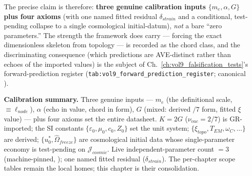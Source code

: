 \noindent The precise claim is therefore: \textbf{three genuine calibration inputs $\{m_e, \alpha, G\}$ plus four axioms} (with one named fitted residual $\delta_{strain}$ and a conditional, test-pending collapse to a single cosmological initial-datum), \emph{not} a bare ``zero parameters.'' The strength the framework does carry --- forcing the exact dimensionless skeleton from topology --- is recorded as the chord class, and the discriminating consequence (which predictions are AVE-distinct rather than echoes of the imported values) is the subject of Ch.~\ref{ch:vol9_falsification_tests}'s forward-prediction register (\texttt{tab:vol9\_forward\_prediction\_register}; canonical ).

\begin{summarybox}
\textbf{Calibration summary.} Three genuine inputs --- $m_e$ (the definitional scale, $\equiv \ell_{node}$), $\alpha$ (echo in value, chord in form), $G$ (mixed: derived $/7$ form, fitted $\xi$ value) --- plus four axioms set the entire datasheet. $K = 2G$ ($\nu_{vac} = 2/7$) is GR-imported; the SI constants $\{\varepsilon_0, \mu_0, c_0, Z_0\}$ set the unit system; $\{\xi_{topo}, T_{EM}, \omega_C, \ldots\}$ are derived; $\{u_0^*, \hat{\Omega}_{freeze}\}$ are cosmological initial data whose single-parameter economy is test-pending on $\mathcal{J}_{cosmic}$. Live independent-parameter count $= 3$ (machine-pinned, ); one named fitted residual ($\delta_{strain}$). The per-chapter scope tables remain the local homes; this chapter is their consolidation.
\end{summarybox}
